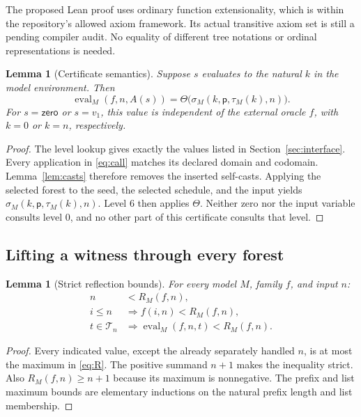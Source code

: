 \documentclass[11pt,letterpaper]{article}
\newtheorem{lemma}[theorem]{Lemma}
\theoremstyle{definition}
\newcommand{\Eval}{\operatorname{eval}}
\newcommand{\ps}{\mathsf p}
\begin{document}
The proposed Lean proof uses ordinary function extensionality, which is within
the repository's allowed axiom framework. Its actual transitive axiom set is
still a pending compiler audit. No equality of different tree notations or
ordinal representations is needed.

\begin{lemma}[Certificate semantics]\label{lem:certificate}
Suppose $s$ evaluates to the natural $k$ in the model environment. Then
\begin{equation}\label{eq:cert-eval}
 \Eval_M(f,n,A(s))=
     \Theta\bigl(\sigma_M(k,\ps,\tau_M(k),n)\bigr).
\end{equation}
For $s=\mathsf{zero}$ or $s=v_1$, this value is independent of the external
oracle $f$, with $k=0$ or $k=n$, respectively.
\end{lemma}
\begin{proof}
The level lookup gives exactly the values listed in Section~\ref{sec:interface}.
Every application in \eqref{eq:call} matches its declared domain and codomain.
Lemma~\ref{lem:casts} therefore removes the inserted self-casts. Applying the
selected forest to the seed, the selected schedule, and the input yields
$\sigma_M(k,\ps,\tau_M(k),n)$. Level 6 then applies $\Theta$. Neither zero
nor the input variable consults level 0, and no other part of this certificate
consults that level.
\end{proof}

\subsection{Lifting a witness through every forest}

\begin{lemma}[Strict reflection bounds]\label{lem:bounds}
For every model $M$, family $f$, and input $n$:
\begin{align*}
 n&<R_M(f,n),\\
 i\le n&\Longrightarrow f(i,n)<R_M(f,n),\\
 t\in\mathcal T_n&\Longrightarrow
             \Eval_M(f,n,t)<R_M(f,n).
\end{align*}
\end{lemma}
\begin{proof}
Every indicated value, except the already separately handled $n$, is at most
the maximum in \eqref{eq:R}. The positive summand $n+1$ makes the inequality
strict. Also $R_M(f,n)\ge n+1$ because its maximum is nonnegative.
The prefix and list maximum bounds are elementary inductions on the natural
prefix length and list membership.
\end{proof}
\end{document}
